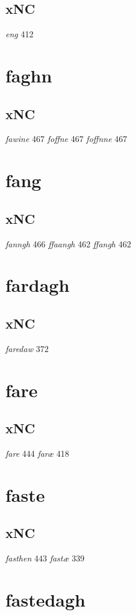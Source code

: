 \documentclass[a4paper,twocolumn]{article}
\begin{document}
\subsection{xNC}
\label{sec:org363e8ad}
\emph{eng} 412 
\section{faghn}
\label{sec:org6be15fd}
\subsection{xNC}
\label{sec:org0ce6f0d}
\emph{fawine} 467 \emph{foffne} 467 \emph{foffnne} 467 
\section{fang}
\label{sec:orgf7daf8c}
\subsection{xNC}
\label{sec:org78ad0f4}
\emph{fanngh} 466 \emph{ffaangh} 462 \emph{ffangh} 462 
\section{fardagh}
\label{sec:orgfb0fdb6}
\subsection{xNC}
\label{sec:org87c6052}
\emph{faredaw} 372 
\section{fare}
\label{sec:org5b8b614}
\subsection{xNC}
\label{sec:org5fd71e6}
\emph{fare} 444 \emph{faræ} 418 
\section{faste}
\label{sec:org7174034}
\subsection{xNC}
\label{sec:org4cdfe88}
\emph{fasthen} 443 \emph{fastæ} 339 
\section{fastedagh}
\label{sec:orgd021a56}
\end{document}

